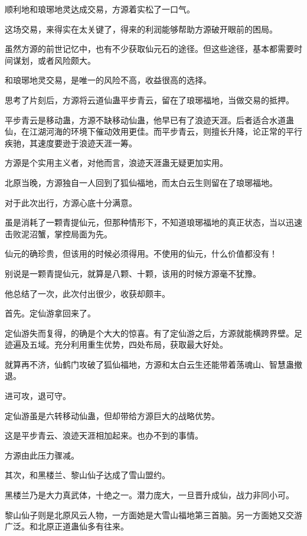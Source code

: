 
\begin{this_body}

顺利地和琅琊地灵达成交易，方源着实松了一口气。

这场交易，来得实在太关键了，得来的利润能够帮助方源破开眼前的困局。

虽然方源的前世记忆中，也有不少获取仙元石的途径。但这些途径，基本都需要时间谋划，或者风险颇大。

和琅琊地灵交易，是唯一的风险不高，收益很高的选择。

思考了片刻后，方源将云道仙蛊平步青云，留在了琅琊福地，当做交易的抵押。

平步青云是移动蛊，方源不缺移动仙蛊，他早已有了浪迹天涯。后者适合水道蛊仙，在江湖河海的环境下催动效用更佳。而平步青云，则擅长升降，论正常的平行疾驰，其速度要逊于浪迹天涯一筹。

方源是个实用主义者，对他而言，浪迹天涯蛊无疑更加实用。

北原当晚，方源独自一人回到了狐仙福地，而太白云生则留在了琅琊福地。

对于此次出行，方源心底十分满意。

虽是消耗了一颗青提仙元，但那种情形下，不知道琅琊福地的真正状态，当以迅速击败泥沼蟹，掌控局面为先。

仙元的确珍贵，但该用的时候必须得用。不使用的仙元，什么价值都没有！

别说是一颗青提仙元，就算是八颗、十颗，该用的时候方源毫不犹豫。

他总结了一次，此次付出很少，收获却颇丰。

首先。定仙游拿回来了。

定仙游失而复得，的确是个大大的惊喜。有了定仙游之后，方源就能横跨界壁。足迹遍及五域。充分利用重生优势，四处布局，获取最大好处。

就算再不济，仙鹤门攻破了狐仙福地，方源和太白云生还能带着荡魂山、智慧蛊撤退。

进可攻，退可守。

定仙游虽是六转移动仙蛊，但却带给方源巨大的战略优势。

这是平步青云、浪迹天涯相加起来。也办不到的事情。

方源由此压力骤减。

其次，和黑楼兰、黎山仙子达成了雪山盟约。

黑楼兰乃是大力真武体，十绝之一。潜力庞大，一旦晋升成仙，战力非同小可。

黎山仙子则是北原风云人物，一方面她是大雪山福地第三首脑。另一方面她又交游广泛。和北原正道蛊仙多有往来。


\end{this_body}

